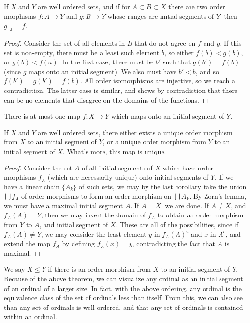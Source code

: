\begin{lemma}
    If $X$ and $Y$ are well ordered sets, and if for $A \subset B \subset X$ there are two order morphisms $f:A \to Y$ and $g:B \to Y$ whose ranges are initial segments of $Y$, then $g|_A = f$.
\end{lemma}
\begin{proof}
    Consider the set of all elements in $B$ that do not agree on $f$ and $g$. If this set is non-empty, there must be a least such element $b$, so either $f(b) < g(b)$, or $g(b) < f(a)$. In the first case, there must be $b'$ such that $g(b') = f(b)$ (since $g$ maps onto an initial segment). We also must have $b' < b$, and so $f(b') = g(b') = f(b)$. All order isomorphisms are injective, so we reach a contradiction. The latter case is similar, and shows by contradiction that there can be no elements that disagree on the domains of the functions.
\end{proof}

\begin{corollary}
    There is at most one map $f:X \to Y$ which maps onto an initial segment of $Y$.
\end{corollary}

\begin{lemma}
    If $X$ and $Y$ are well ordered sets, there either exists a unique order morphism from $X$ to an initial segment of $Y$, or a unique order morphism from $Y$ to an initial segment of $X$. What's more, this map is unique.
\end{lemma}
\begin{proof}
    Consider the set $A$ of all initial segments of $X$ which have order morphisms $f_A$ (which are necessarily unique) onto initial segments of $Y$. If we have a linear chain $\{A_k\}$ of such sets, we may by the last corollary take the union $\bigcup f_A$ of order morphisms to form an order morphism on $\bigcup A_k$. By Zorn's lemma, we must have a maximal initial segment $A$. If $A = X$, we are done. If $A \neq X$, and $f_A(A) = Y$, then we may invert the domain of $f_A$ to obtain an order morphism from $Y$ to $A$, and initial segment of $X$. These are all of the possibilities, since if $f_A(A) \neq Y$, we may consider the least element $y$ in $f_A(A)^c$ and $x$ in $A^c$, and extend the map $f_A$ by defining $f_A(x) = y$, contradicting the fact that $A$ is maximal.
\end{proof}

We say $X \leq Y$ if there is an order morphism from $X$ to an initial segment of $Y$. Because of the above theorem, we can visualize any ordinal as an initial segment of an ordinal of a larger size. In fact, with the above ordering, any ordinal is the equivalence class of the set of ordinals less than itself. From this, we can also see than any set of ordinals is well ordered, and that any set of ordinals is contained within an ordinal.


